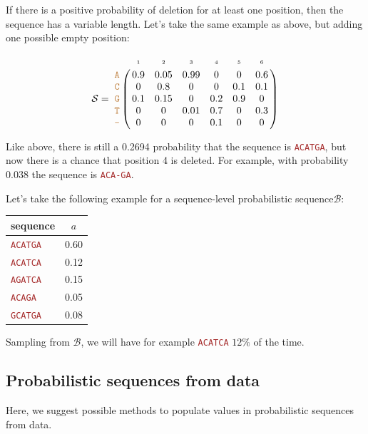 \documentclass[10pt]{article}
\newcommand{\sq}[1]{\texttt{\textcolor{brown}{#1}}}
\newcommand{\sps}{\mathcal{B}} %
\newcommand{\nps}{\mathcal{S}} %
\newcommand{\slps}{sequence-level probabilistic sequence\xspace}
\begin{document}
If there is a positive probability of deletion for at least one position, then the sequence has a variable length. 
Let's take the same example as above, but adding one possible empty position:

$$
\nps = 
\bordermatrix{
&\scriptscriptstyle{1} & \scriptscriptstyle{2}& \scriptscriptstyle{3}& \scriptscriptstyle{4} & \scriptscriptstyle{5} & \scriptscriptstyle{6} \cr
\sq{A} & 0.9 & 0.05   & 0.99 & 0 & 0 & 0.6\cr
\sq{C} & 0   & 0.8 & 0 & 0 & 0.1 & 0.1\cr
\sq{G} & 0.1 & 0.15 & 0 & 0.2 & 0.9 & 0\cr
\sq{T} & 0 & 0 & 0.01 & 0.7 & 0 & 0.3\cr
\sq{-} & 0 & 0 & 0 & 0.1 & 0 & 0\cr
}
$$

\noindent Like above, there is still a 0.2694 probability that the sequence is \sq{ACATGA}, but now there is a chance that position 4 is deleted. For example, with probability 0.038 the sequence is \sq{ACA-GA}.

Let's take the following example for a \slps $\sps$:
\begin{table}[H]
\begin{center}
\begin{tabular}{lc}
\hline
sequence & $a$ \\
\hline
\sq{ACATGA} & 0.60 \\
\sq{ACATCA} & 0.12 \\
\sq{AGATCA} & 0.15 \\
\sq{ACAGA}  & 0.05 \\
\sq{GCATGA} & 0.08 \\
\hline
\end{tabular}
\end{center}
\label{default}
\end{table}%
Sampling from $\sps$, we will have for example \sq{ACATCA} $12\%$ of the time. 


\subsection{Probabilistic sequences from data}

Here, we suggest possible methods to populate values in probabilistic sequences from data. 
\end{document}
